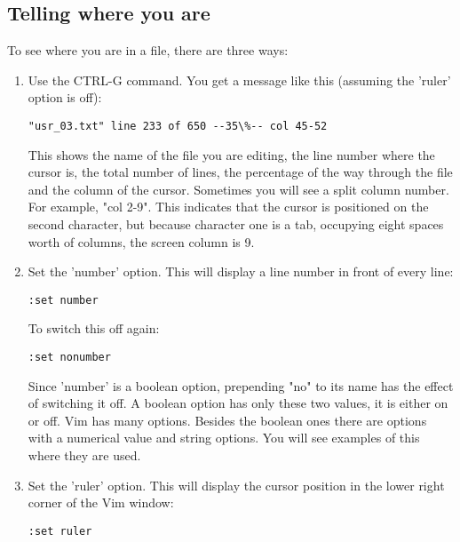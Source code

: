 \subsection{Telling where you are}
To see where you are in a file, there are three ways:
\begin{enumerate}
				\item  Use the CTRL-G command.
								You get a message like this (assuming the 'ruler' option is off):
								\begin{Verbatim}[samepage=true]
	"usr_03.txt" line 233 of 650 --35\%-- col 45-52 
								\end{Verbatim}

								This shows the name of the file you are editing, the line number where the cursor is, the total number of lines, the percentage of the way through the file and the column of the cursor.
								Sometimes you will see a split column number.
								For example, "col 2-9".
								This indicates that the cursor is positioned on the second character, but because character one is a tab, occupying eight spaces worth of columns, the screen column is 9.

				\item  Set the 'number' option.  This will display a line number in front of
								every line:

								\begin{Verbatim}[samepage=true]
	:set number
								\end{Verbatim}

								To switch this off again:

								\begin{Verbatim}[samepage=true]
	:set nonumber
								\end{Verbatim}

								Since 'number' is a boolean option, prepending "no" to its name has the effect of switching it off.
								A boolean option has only these two values, it is either on or off.
								Vim has many options.
								Besides the boolean ones there are options with a numerical value and string options.
								You will see examples of this where they are used.

				\item  Set the 'ruler' option.
								This will display the cursor position in the lower right corner of the Vim window:

								\begin{Verbatim}[samepage=true]
	:set ruler
								\end{Verbatim}

\end{enumerate}

